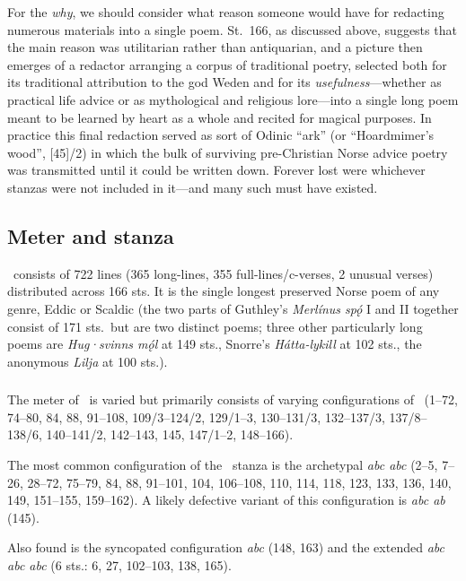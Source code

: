 For the \emph{why}, we should consider what reason someone would have for redacting numerous materials into a single poem.  St.~166, as discussed above, suggests that the main reason was utilitarian rather than antiquarian, and a picture then emerges of a redactor arranging a corpus of traditional poetry, selected both for its traditional attribution to the god Weden and for its \emph{usefulness}---whether as practical life advice or as mythological and religious lore---into a single long poem meant to be learned by heart as a whole and recited for magical purposes.  In practice this final redaction served as sort of Odinic “ark” (or “Hoardmimer’s wood”, [45]/2) in which the bulk of surviving pre-Christian Norse advice poetry was transmitted until it could be written down.  Forever lost were whichever stanzas were not included in it---and many such must have existed.

\subsection{Meter and stanza}

\Havamal\ consists of 722 lines (365 long-lines, 355 full-lines/c-verses, 2 unusual verses) distributed across 166 sts.  It is the single longest preserved Norse poem of any genre, Eddic or Scaldic (the two parts of Guthley’s \emph{Merlínus spǫ́} I and II together consist of 171 sts.~but are two distinct poems; three other particularly long poems are \emph{Hug·svinns mǫ́l} at 149 sts., Snorre’s \emph{Hátta-lykill} at 102 sts., the anonymous \emph{Lilja} at 100 sts.).

\subsubsection{\Ljodahattr}

The meter of \Havamal\ is varied but primarily consists of varying configurations of \Ljodahattr\ (1--72, 74--80, 84, 88, 91--108, 109/3--124/2, 129/1--3, 130--131/3, 132--137/3, 137/8--138/6, 140--141/2, 142--143, 145, 147/1--2, 148--166).

The most common configuration of the \Ljodahattr\ stanza is the archetypal \emph{abc abc} (2--5, 7--26, 28--72, 75--79, 84, 88, 91--101, 104, 106--108, 110, 114, 118, 123, 133, 136, 140, 149, 151--155, 159--162).  A likely defective variant of this configuration is \emph{abc ab} (145).

Also found is the syncopated configuration \emph{abc} (148, 163) and the extended \emph{abc abc abc} (6 sts.: 6, 27, 102--103, 138, 165).

